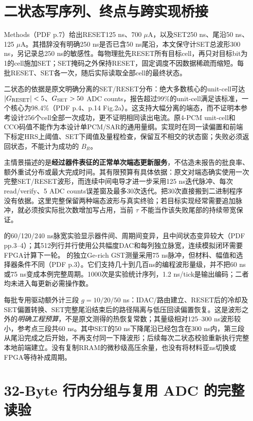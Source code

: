 \section{二状态写序列、终点与跨实现桥接}

 Methods（PDF p.7）给出RESET125 ns、700 $\mu$A，以及SET250 ns、尾沿50 ns、125 $\mu$A。其措辞没有明确250 ns是否已含50 ns尾沿，本文保守计SET总波形300 ns，另记录总250 ns的敏感性。每物理批先RESET所有目标cell，再只对目标bit为1的cell施加SET；SET掩码之外保持RESET，固定调度不因数据稀疏而缩短。每批RESET、SET各一次，随后实际读取全部cell的最终状态。

二状态的依据是原文明确分离的SET/RESET分布：绝大多数核心的unit-cell可达 $|G_{\rm RESET}|<5$、$G_{\rm SET}>50$ ADC counts，报告超过99\%的unit-cell满足该标准，一个核心为98.4\%（PDF p.4、p.14 Fig.2a）。这支持大幅分离的端态，而不证明本参考设计256个cell全部一次成功，更不证明相同读出电流。原4-PCM unit-cell和CCO码值不能作为本设计单PCM/SAR的通用量纲。实现时在同一读偏置和前端下标定HRS上阈值、SET下阈值及量程检查，保留互不相交的状态窗；失败必须返回状态，不能计为成功的 $B_R$。

主情景描述的是\textbf{经过器件表征的正常单次端态更新服务}，不估造未报告的批良率、额外重试分布或最大完成时间。其有限预算有具体依据：原文对端态确实使用一次完整SET/RESET波形，而连续中间电导才进一步采用125 ns迭代脉冲、每次read/verify、5 ADC counts误差窗及最多30次迭代。把30次直接搬到二进制程序没有依据。这里完整保留两种端态波形与真实终验；若目标实现经常需要追加脉冲，就必须按实际批次数增加写占用，当前 $\tau$ 不能当作该失败尾部的持续带宽保证。

 的60/120/240 ns脉宽实验显示器件间、周期间变异，且中间状态变异较大（PDF pp.3--4）；其512列行并行使用公共幅度DAC和每列独立脉宽，连续模拟闭环需要FPGA计算下一轮。 的独立Ge-rich GST测量采用75 ns脉冲，但材料、幅值和选择器条件不同（PDF p.3）。它们支持几十到几百ns的编程波形量级，并不把60 ns或75 ns变成本例完整周期。1000次是实验统计序列，1.2 ns/tick是输出编码；二者均未进入每更新必需操作数。

每批专用驱动额外计三段 $g=10/20/50$ ns：IDAC/路由建立、RESET后的冷却及SET偏置转换、SET完整尾沿结束后的路径隔离与低压回读偏置恢复。这是波形之外的\emph{明确工程预算}，不是原文测得的热恢复常数；其量级相对125--300 ns波形较小，参考点三段共60 ns。其中SET的50 ns下降尾沿已经包含在300 ns内，第三段从尾沿完成之后开始，不再支付同一下降波形；后续每次二状态校验重新执行完整本地前端建立。没有复制RRAM的微秒级高压余量，也没有将材料亚ns切换或FPGA等待补成周期。

\section{32-Byte 行内分组与复用 ADC 的完整读验}

